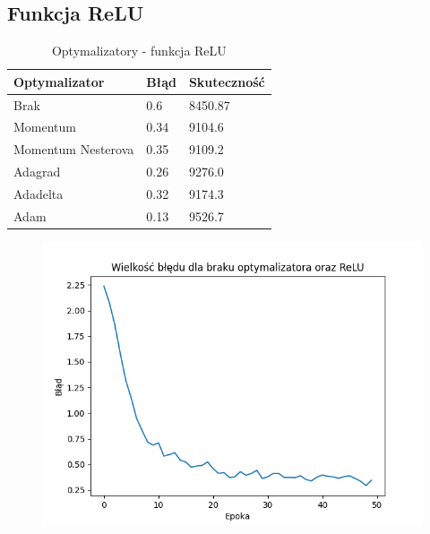 \documentclass{article}
\begin{document}
\newpage
\subsection{Funkcja ReLU}

\begin{table}[h]
  \centering
    
  \bgroup
  \def\arraystretch{1.3}
  \begin{tabular}{|l|l|l|}
  \hline
  Optymalizator & Błąd & Skuteczność \\ \hline
  Brak & 0.6 & 8450.87 \\ \hline
  Momentum & 0.34 & 9104.6 \\ \hline
  Momentum Nesterova & 0.35 & 9109.2 \\ \hline
  Adagrad & 0.26 & 9276.0 \\ \hline
  Adadelta & 0.32 & 9174.3 \\ \hline
  Adam & 0.13 & 9526.7 \\ \hline
  \end{tabular} 
  \egroup
  \vspace{10pt}
  \caption{Optymalizatory - funkcja ReLU}
\end{table}

\newpage
\begin{figure}[!htb]
  \centering
  \includegraphics[width=\linewidth]{error_none_ReLU.png}
\end{figure}
\end{document}
